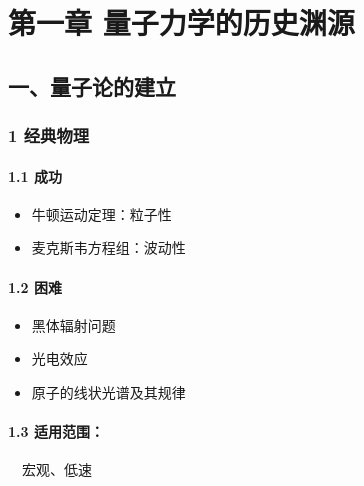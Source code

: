 \documentclass[UTF8,twocolumn]{ctexart}
\date{}
\providecommand{\tightlist}{%
  \setlength{\itemsep}{0pt}\setlength{\parskip}{0pt}}
\let\oldparagraph\paragraph
\renewcommand{\paragraph}[1]{\oldparagraph{#1}\mbox{}}
\begin{document}
\hypertarget{ux7b2cux4e00ux7ae0-ux91cfux5b50ux529bux5b66ux7684ux5386ux53f2ux6e0aux6e90}{%
\section{第一章{ }量子力学的历史渊源}\label{ux7b2cux4e00ux7ae0-ux91cfux5b50ux529bux5b66ux7684ux5386ux53f2ux6e0aux6e90}}

\hypertarget{ux4e00ux91cfux5b50ux8bbaux7684ux5efaux7acb}{%
\subsection{一、量子论的建立}\label{ux4e00ux91cfux5b50ux8bbaux7684ux5efaux7acb}}

\hypertarget{ux7ecfux5178ux7269ux7406}{%
\subsubsection{1 经典物理}\label{ux7ecfux5178ux7269ux7406}}

\hypertarget{ux6210ux529f}{%
\paragraph{{ }1.1 成功}\label{ux6210ux529f}}

\begin{itemize}
\tightlist
\item
  牛顿运动定理：粒子性
\item
  麦克斯韦方程组：波动性
\end{itemize}

\hypertarget{ux56f0ux96be}{%
\paragraph{{ }1.2 困难}\label{ux56f0ux96be}}

\begin{itemize}
\tightlist
\item
  黑体辐射问题
\item
  光电效应
\item
  原子的线状光谱及其规律
\end{itemize}

\hypertarget{ux9002ux7528ux8303ux56f4}{%
\paragraph{{ }1.3 适用范围：}\label{ux9002ux7528ux8303ux56f4}}

 宏观、低速
\end{document}
